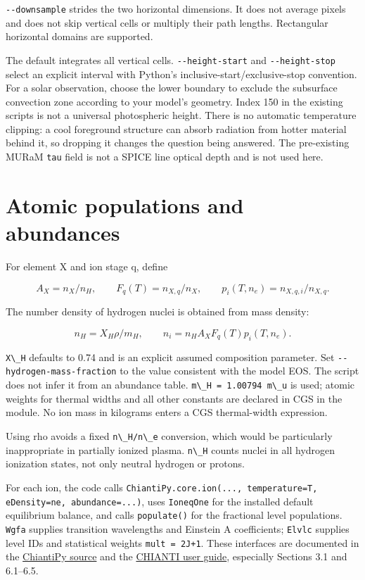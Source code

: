 \documentclass[
]{article}
\newcommand{\passthrough}[1]{#1}
\begin{document}
\passthrough{\lstinline!--downsample!} strides the two horizontal
dimensions. It does not average pixels and does not skip vertical cells
or multiply their path lengths. Rectangular horizontal domains are
supported.

The default integrates all vertical cells.
\passthrough{\lstinline!--height-start!} and
\passthrough{\lstinline!--height-stop!} select an explicit interval with
Python's inclusive-start/exclusive-stop convention. For a solar
observation, choose the lower boundary to exclude the subsurface
convection zone according to your model's geometry. Index 150 in the
existing scripts is not a universal photospheric height. There is no
automatic temperature clipping: a cool foreground structure can absorb
radiation from hotter material behind it, so dropping it changes the
question being answered. The pre-existing MURaM
\passthrough{\lstinline!tau!} field is not a SPICE line optical depth
and is not used here.

\section{Atomic populations and
abundances}\label{atomic-populations-and-abundances}

For element X and ion stage q, define

\[
A_X = n_X/n_H, \qquad F_q(T)=n_{X,q}/n_X, \qquad
p_i(T,n_e)=n_{X,q,i}/n_{X,q}.
\]

The number density of hydrogen nuclei is obtained from mass density:

\[
n_H = X_H\rho/m_H, \qquad
n_i = n_H A_X F_q(T)p_i(T,n_e).
\]

\passthrough{\lstinline!X\_H!} defaults to 0.74 and is an explicit
assumed composition parameter. Set
\passthrough{\lstinline!--hydrogen-mass-fraction!} to the value
consistent with the model EOS. The script does not infer it from an
abundance table. \passthrough{\lstinline!m\_H = 1.00794 m\_u!} is used;
atomic weights for thermal widths and all other constants are declared
in CGS in the module. No ion mass in kilograms enters a CGS
thermal-width expression.

Using rho avoids a fixed \passthrough{\lstinline!n\_H/n\_e!} conversion,
which would be particularly inappropriate in partially ionized plasma.
\passthrough{\lstinline!n\_H!} counts nuclei in all hydrogen ionization
states, not only neutral hydrogen or protons.

For each ion, the code calls
\passthrough{\lstinline!ChiantiPy.core.ion(..., temperature=T, eDensity=ne, abundance=...)!},
uses \passthrough{\lstinline!IoneqOne!} for the installed default
equilibrium balance, and calls \passthrough{\lstinline!populate()!} for
the fractional level populations. \passthrough{\lstinline!Wgfa!}
supplies transition wavelengths and Einstein A coefficients;
\passthrough{\lstinline!Elvlc!} supplies level IDs and statistical
weights \passthrough{\lstinline!mult = 2J+1!}. These interfaces are
documented in the
\href{https://github.com/chianti-atomic/ChiantiPy/blob/master/ChiantiPy/core/Ion.py}{ChiantiPy
source} and the \href{https://www.chiantidatabase.org/cug.pdf}{CHIANTI
user guide}, especially Sections 3.1 and 6.1--6.5.
\end{document}
